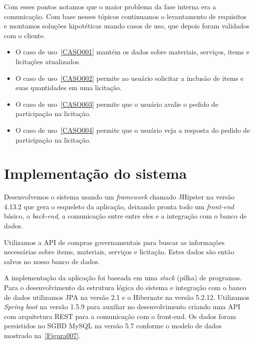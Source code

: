 Com esses pontos notamos que o maior problema da fase interna era a comunicação. 
Com base nesses tópicos continuamos o levantamento de requisitos e montamos soluções hipotéticas usando casos de uso, que depois foram validados com o cliente.

\begin{itemize}
    \item O caso de uso~\ref{CASO001} mantém os dados sobre  materiais, serviços, items e licitações atualizados.
    
    \item O caso de uso~\ref{CASO002} permite ao usuário solicitar a inclusão de items e suas quantidades em uma licitação.

    \item O caso de uso~\ref{CASO003} permite que o usuário avalie o pedido de participação na licitação.
    
    \item O caso de uso~\ref{CASO004} permite que o usuário veja a resposta do pedido de participação na licitação.

\end{itemize}


\section{Implementação do sistema}

Desenvolvemos o sistema usando um \textit{framework} chamado JHipster na versão 4.13.2 que gera o esqueleto da aplicação, deixando pronta todo um \textit{front-end} básico, o \textit{back-end}, a comunicação entre entre eles e a integração com o banco de dados.


Utilizamos a API de compras governamentais para buscar as informações necessárias sobre items, materiais, serviços e licitação.
Estes dados são então salvos no nosso banco de dados.

A implementação da aplicação foi baseada em uma \textit{stack} (pilha) de programas.
Para o desenvolvimento da estrutura lógica do sistema e integração com o banco de dados utilizamos JPA na versão 2.1 e o Hibernate na versão 5.2.12. Utilizamos \textit{Spring boot} na versão 1.5.9 para auxiliar no desenvolvimento criando uma API com arquitetura REST para a comunicação com o front-end.
Os dados foram persistidos no SGBD MySQL na versão 5.7 conforme o modelo de dados mostrado na~\ref{Figura007}.

